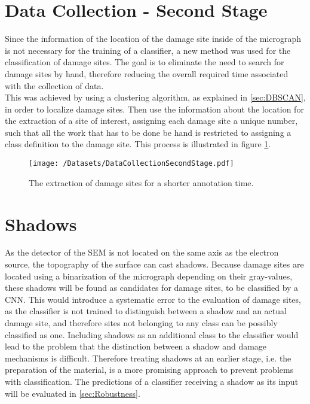 \section{Data Collection - Second Stage}

Since the information of the location of the damage site inside of the micrograph is not necessary for the training of a classifier, a new method was used for the classification of damage sites. The goal is to eliminate the need to search for damage sites by hand, therefore reducing the overall required time associated with the collection of data.\\

This was achieved by using a clustering algorithm, as explained in \ref{sec:DBSCAN}, in order to localize damage sites. Then use the information about the location for the extraction of a site of interest, assigning each damage site a unique number, such that all the work that has to be done be hand is restricted to assigning a class definition to the damage site. This process is illustrated in figure \ref{fig:LabelingSecondStage}.

\begin{figure}
\centering
\texttt{[image: /Datasets/DataCollectionSecondStage.pdf]}
\caption{The extraction of damage sites for a shorter annotation time.}
\label{fig:LabelingSecondStage}
\end{figure}

\section{Shadows}
\label{sec:Shadows}

As the detector of the SEM is not located on the same axis as the electron source, the topography of the surface can cast shadows. Because damage sites are located using a binarization of the micrograph depending on their gray-values, these shadows will be found as candidates for damage sites, to be classified by a CNN. This would introduce a systematic error to the evaluation of damage sites, as the classifier is not trained to distinguish between a shadow and an actual damage site, and therefore sites not belonging to any class can be possibly classified as one. Including shadows as an additional class to the classifier would lead to the problem that the distinction between a shadow and damage mechanisms is difficult. Therefore treating shadows at an earlier stage, i.e. the preparation of the material, is a more promising approach to prevent problems with classification. The predictions of a classifier receiving a shadow as its input will be evaluated in \ref{sec:Robustness}.


